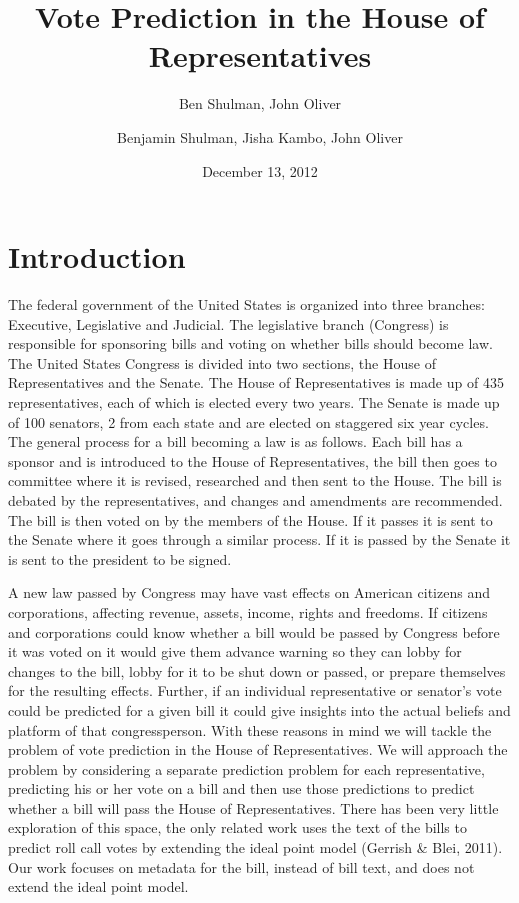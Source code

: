 \documentclass[11pt,letterpaper,twocolumn]{article}
\author{Ben Shulman, John Oliver}
\begin{document}
\title{Vote Prediction in the House of Representatives}
\author{Benjamin Shulman, Jisha Kambo, John Oliver}
\date{December 13, 2012}
\maketitle

\section{Introduction}
The federal government of the United States is organized into three branches: Executive, Legislative and Judicial. The legislative branch (Congress) is responsible for sponsoring bills and voting on whether bills should become law. The United States Congress is divided into two sections, the House of Representatives and the Senate. The House of Representatives is made up of 435 representatives, each of which is elected every two years. The Senate is made up of 100 senators, 2 from each state and are elected on staggered six year cycles. The general process for a bill becoming a law is as follows. Each bill has a sponsor and is introduced to the House of Representatives, the bill then goes to committee where it is revised, researched and then sent to the House. The bill is debated by the representatives, and changes and amendments are recommended. The bill is then voted on by the members of the House. If it passes it is sent to the Senate where it goes through a similar process. If it is passed by the Senate it is sent to the president to be signed.

	A new law passed by Congress may have vast effects on American citizens and corporations, affecting revenue, assets, income, rights and freedoms. If citizens and corporations could know whether a bill would be passed by Congress before it was voted on it would give them advance warning so they can lobby for changes to the bill, lobby for it to be shut down or passed, or prepare themselves for the resulting effects. Further, if an individual representative or senator's vote could be predicted for a given bill it could give insights into the actual beliefs and platform of that congressperson. With these reasons in mind we will tackle the problem of vote prediction in the House of Representatives. We will approach the problem by considering a separate prediction problem for each representative, predicting his or her vote on a bill and then use those predictions to predict whether a bill will pass the House of Representatives. There has been very little exploration of this space, the only related work uses the text of the bills to predict roll call votes by extending the ideal point model (Gerrish \& Blei, 2011). Our work focuses on metadata for the bill, instead of bill text, and does not extend the ideal point model.
\end{document}
